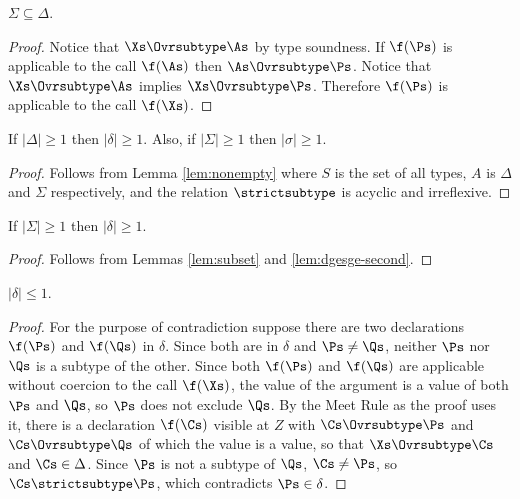 \begin{lemma}
\label{lem:subset}
$\Sigma \subseteq \Delta$.
\end{lemma}

\begin{proof}
Notice that $\Xs \Ovrsubtype \As$ by type soundness.
If $\f(\Ps)$ is applicable to
the call $\f(\As)$ then $\As \Ovrsubtype \Ps$.  Notice that $\Xs
\Ovrsubtype \As$ implies $\Xs \Ovrsubtype \Ps$.  Therefore
$\f(\Ps)$ is applicable to the call $\f(\Xs)$.
\end{proof}

\begin{lemma}
\label{lem:dgesge-second}
If $|\Delta| \ge 1$ then $|\delta| \ge 1$.
Also, if $|\Sigma| \ge 1$ then $|\sigma| \ge 1$.
\end{lemma}

\begin{proof}
Follows from Lemma \ref{lem:nonempty} where $S$ is the set of all
types, $A$ is $\Delta$ and $\Sigma$ respectively,
and the relation $\strictsubtype$ is acyclic and irreflexive.
\end{proof}

\begin{lemma}
\label{lem:ge}
If $|\Sigma| \ge 1$ then $|\delta| \ge 1$.
\end{lemma}

\begin{proof}
Follows from Lemmas \ref{lem:subset} and \ref{lem:dgesge-second}.
\end{proof}

\begin{lemma}
\label{lem:le}
$|\delta| \le 1$.
\end{lemma}

\begin{proof}
For the purpose of contradiction suppose there are two declarations
$\f(\Ps)$ and $\f(\Qs)$ in $\delta$.  Since both are in $\delta$ and
$\Ps \neq \Qs$, neither $\Ps$ nor $\Qs$ is a subtype of the other.
Since both $\f(\Ps)$ and $\f(\Qs)$ are applicable without coercion to the call
$\f(\Xs)$, the value of the argument is a value of both $\Ps$ and $\Qs$, so
$\Ps$ does not exclude $\Qs$.
By the Meet Rule as the proof uses it, there is a declaration $\f(\Cs)$
visible at $Z$ with $\Cs \Ovrsubtype \Ps$ and $\Cs \Ovrsubtype \Qs$ of which the
value is a value, so that $\Xs \Ovrsubtype \Cs$ and $\Cs \in \Delta$.
Since $\Ps$ is not a subtype of $\Qs$, $\Cs \neq \Ps$, so
$\Cs \strictsubtype \Ps$, which contradicts $\Ps \in \delta$.
\end{proof}

